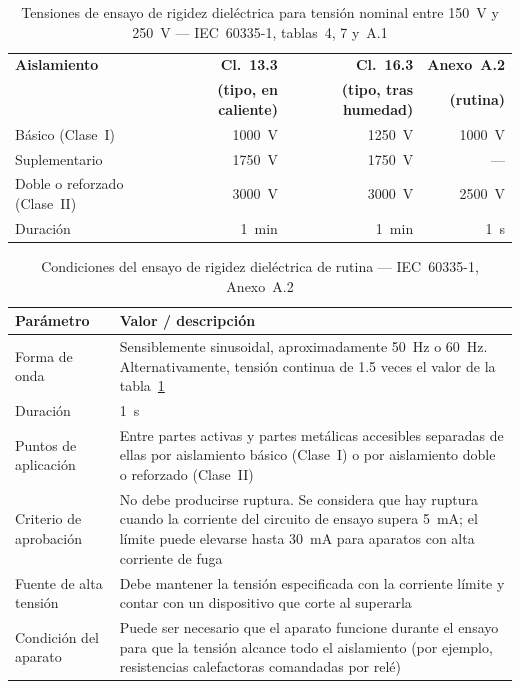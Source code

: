 \begin{table}[H]
\centering
\caption{Tensiones de ensayo de rigidez dieléctrica para tensión nominal entre \SI{150}{\volt} y \SI{250}{\volt} --- IEC~60335-1, tablas~4, 7 y~A.1}
\label{tab:hipot_tensiones}
\renewcommand{\arraystretch}{1.35}
\begin{tabular}{@{} l r r r @{}}
\toprule
\textbf{Aislamiento}
    & \textbf{Cl.~13.3}
    & \textbf{Cl.~16.3}
    & \textbf{Anexo~A.2} \\
    & \textbf{(tipo, en caliente)}
    & \textbf{(tipo, tras humedad)}
    & \textbf{(rutina)} \\
\midrule
Básico (Clase~I)
    & \SI{1000}{\volt}
    & \SI{1250}{\volt}
    & \SI{1000}{\volt} \\
Suplementario
    & \SI{1750}{\volt}
    & \SI{1750}{\volt}
    & --- \\
Doble o reforzado (Clase~II)
    & \SI{3000}{\volt}
    & \SI{3000}{\volt}
    & \SI{2500}{\volt} \\
\midrule
Duración
    & \SI{1}{\minute}
    & \SI{1}{\minute}
    & \SI{1}{\second} \\
\bottomrule
\end{tabular}
\end{table}

\begin{table}[H]
\centering
\caption{Condiciones del ensayo de rigidez dieléctrica de rutina --- IEC~60335-1, Anexo~A.2}
\label{tab:hipot_condiciones}
\renewcommand{\arraystretch}{1.35}
\begin{tabular}{@{} p{4.5cm} p{8cm} @{}}
\toprule
\textbf{Parámetro} & \textbf{Valor / descripción} \\
\midrule
Forma de onda
    & Sensiblemente sinusoidal, aproximadamente \SI{50}{\hertz} o
      \SI{60}{\hertz}. Alternativamente, tensión continua de \num{1.5}
      veces el valor de la tabla~\ref{tab:hipot_tensiones} \\
\addlinespace
Duración
    & \SI{1}{\second} \\
\addlinespace
Puntos de aplicación
    & Entre partes activas y partes metálicas accesibles separadas
      de ellas por aislamiento básico (Clase~I) o por aislamiento doble
      o reforzado (Clase~II) \\
\addlinespace
Criterio de aprobación
    & No debe producirse ruptura. Se considera que hay ruptura cuando
      la corriente del circuito de ensayo supera \SI{5}{\milli\ampere};
      el límite puede elevarse hasta \SI{30}{\milli\ampere} para aparatos
      con alta corriente de fuga \\
\addlinespace
Fuente de alta tensión
    & Debe mantener la tensión especificada con la corriente límite y
      contar con un dispositivo que corte al superarla \\
\addlinespace
Condición del aparato
    & Puede ser necesario que el aparato funcione durante el ensayo
      para que la tensión alcance todo el aislamiento (por ejemplo,
      resistencias calefactoras comandadas por relé) \\
\bottomrule
\end{tabular}
\end{table}

